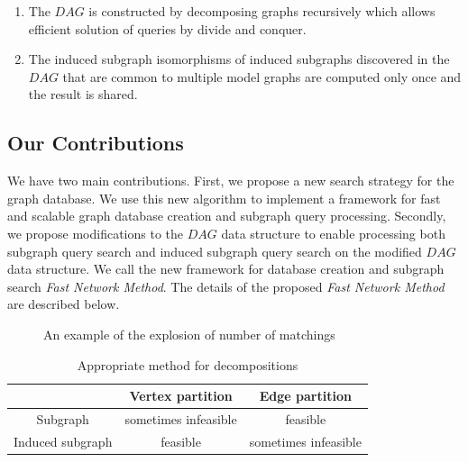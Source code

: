 \begin{enumerate}
\item The $DAG$ is constructed by decomposing graphs recursively which allows efficient solution of queries by divide and conquer.
\item The induced subgraph isomorphisms of induced subgraphs discovered in the $DAG$ that are common to multiple model graphs are computed only once and the result is shared.
\end{enumerate}

\subsection{Our Contributions}
We have two main contributions. First, we propose a new search strategy for the graph database. We use this new algorithm to implement a framework for fast and scalable graph database creation and subgraph query processing. Secondly, we propose modifications to the $DAG$ data structure to enable processing both subgraph query search and induced subgraph query search on the modified $DAG$ data structure. We call the new framework for database creation and subgraph search \textit{Fast Network Method}. The details of the proposed \textit{Fast Network Method} are described below.


\begin{figure}
        \centering
        
        \caption{An example of the explosion of number of matchings \label{fig:fig3} }
\end{figure}

\begin{table}
\begin{center}\begin{tabular}{|c|c|c|}
\hline
  & Vertex partition  & Edge partition  \\ \hline
Subgraph & sometimes infeasible  & feasible \\ \hline
Induced subgraph & feasible & sometimes  infeasible \\ \hline
\end{tabular}
\caption{Appropriate method for decompositions \label{tab:table1} }
\end{center}
\end{table}

